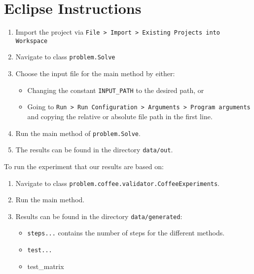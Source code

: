 \section{Eclipse Instructions}


\begin{enumerate}
	\item Import the project via \texttt{File > Import > Existing Projects into Workspace}
	\item Navigate to class \texttt{problem.Solve}
	\item Choose the input file for the main method by either:
	\begin{itemize}
		\item Changing the constant \texttt{INPUT\_PATH} to the desired path, or
		\item Going to \texttt{Run > Run Configuration > Arguments > Program arguments} and copying the relative or absolute file path in the first line.
	\end{itemize}
	\item Run the main method of \texttt{problem.Solve}.
	\item The results can be found in the directory \texttt{data/out}.
\end{enumerate}


To run the experiment that our results are based on:

\begin{enumerate}
	\item Navigate to class \texttt{problem.coffee.validator.CoffeeExperiments}.
	\item Run the main method.
	\item Results can be found in the directory \texttt{data/generated}:
	\begin{itemize}
		\item \texttt{steps...} contains the number of steps for the different methods.
		\item \texttt{test...}
		\item test\_matrix
	\end{itemize}
	
\end{enumerate}

